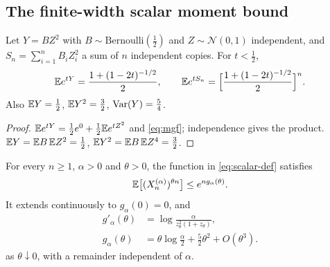 \subsection{The finite-width scalar moment bound}

\begin{lemma}\label{lem:mgf}
Let $Y=BZ^2$ with $B\sim\mathrm{Bernoulli}(\tfrac12)$ and $Z\sim\mathcal N(0,1)$ independent, and $S_n=\sum_{i=1}^nB_iZ_i^2$ a sum of $n$ independent copies. For $t<\tfrac12$,
\begin{equation}\label{eq:mgfS}
\mathbb{E} e^{tY}=\frac{1+(1-2t)^{-1/2}}{2},\qquad\mathbb{E} e^{tS_n}=\Bigl[\frac{1+(1-2t)^{-1/2}}{2}\Bigr]^n .
\end{equation}
Also $\mathbb{E} Y=\tfrac12$, $\mathbb{E} Y^2=\tfrac32$, $\operatorname{Var}(Y)=\tfrac54$.
\end{lemma}

\begin{proof}
$\mathbb{E} e^{tY}=\tfrac12e^0+\tfrac12\mathbb{E} e^{tZ^2}$ and \cref{eq:mgf}; independence gives the product. $\mathbb{E} Y=\mathbb{E} B\,\mathbb{E} Z^2=\tfrac12$, $\mathbb{E} Y^2=\mathbb{E} B\,\mathbb{E} Z^4=\tfrac32$.
\end{proof}

\begin{lemma}\label{lem:scalar}
For every $n\ge1$, $\alpha>0$ and $\theta>0$, the function in \cref{eq:scalar-def} satisfies
\begin{equation}\label{eq:scalar-bound}
\mathbb{E}\bigl[(X_n^{(\alpha)})^{\theta n}\bigr]\le e^{n g_\alpha(\theta)}.
\end{equation}
It extends continuously to $g_\alpha(0)=0$, and
\begin{align}
g'_\alpha(\theta)&=\log\frac{\alpha}{z_\theta^2(1+z_\theta)},\label{eq:scalar-derivative}\\
g_\alpha(\theta)&=\theta\log\frac\alpha2+\frac52\theta^2+O(\theta^3).
\label{eq:scalar-expansion}
\end{align}
as $\theta\downarrow0$, with a remainder independent of $\alpha$.
\end{lemma}

